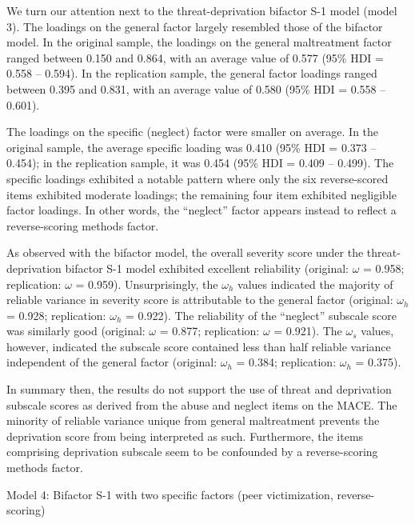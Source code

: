 \documentclass[letterpaper,man,natbib,floatsintext,longtable]{apa6}
\makeatletter
\renewcommand{\subsubsection}{\@startsection{subsubsection}{3}
  {\z@}%
  {\b@level@two@skip}{\e@level@two@skip}%
  {\normalfont\normalsize\bfseries}}
\makeatother
\begin{document}
We turn our attention next to the threat-deprivation bifactor S-1 model (model 3). The loadings on the general factor largely resembled those of the bifactor model. In the original sample, the loadings on the general maltreatment factor ranged between 0.150 and 0.864, with an average value of 0.577 (95\% HDI = 0.558 -- 0.594). In the replication sample, the general factor loadings ranged between 0.395 and 0.831, with an average value of 0.580 (95\% HDI = 0.558 -- 0.601). 

The loadings on the specific (neglect) factor were smaller on average. In the original sample, the average specific loading was 0.410 (95\% HDI = 0.373 -- 0.454); in the replication sample, it was 0.454 (95\% HDI = 0.409 -- 0.499). The specific loadings exhibited a notable pattern where only the six reverse-scored items exhibited moderate loadings; the remaining four item exhibited negligible factor loadings. In other words, the ``neglect'' factor appears instead to reflect a reverse-scoring methods factor.

As observed with the bifactor model, the overall severity score under the threat- deprivation bifactor S-1 model exhibited excellent reliability (original: $\omega$ = 0.958; replication: $\omega$ = 0.959). Unsurprisingly, the $\omega_h$ values indicated the majority of reliable variance in severity score is attributable to the general factor (original: $\omega_h$ = 0.928; replication: $\omega_h$ = 0.922). The reliability of the ``neglect'' subscale score was similarly good (original: $\omega$ = 0.877; replication: $\omega$ = 0.921). The $\omega_s$ values, however, indicated the subscale score contained less than half reliable variance independent of the general factor (original: $\omega_h$ = 0.384; replication: $\omega_h$ = 0.375). 

In summary then, the results do not support the use of threat and deprivation subscale scores as derived from the abuse and neglect items on the MACE. The minority of reliable variance unique from general maltreatment prevents the deprivation score from being interpreted as such. Furthermore, the items comprising deprivation subscale seem to be confounded by a reverse-scoring methods factor.

\subsubsection{Model 4: Bifactor S-1 with two specific factors (peer victimization, reverse-scoring)}
\end{document}
